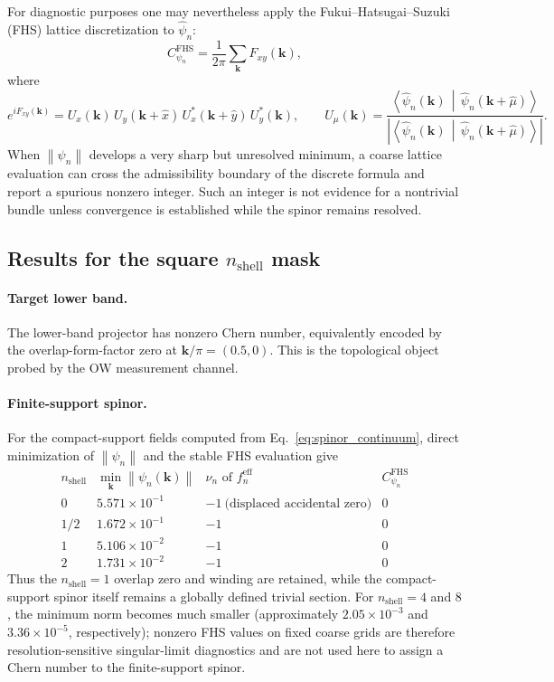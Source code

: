 \documentclass[aps,prb,onecolumn,nofootinbib,superscriptaddress]{revtex4-2}
\newcommand{\mbf}[1]{\mathbf{#1}}
\newcommand{\braket}[2]{\left\langle#1\,\middle|\,#2\right\rangle}
\newcommand{\norm}[1]{\left\lVert#1\right\rVert}
\begin{document}
For diagnostic purposes one may nevertheless apply the Fukui--Hatsugai--Suzuki (FHS) lattice discretization to $\hat{\psi}_n$:
\begin{equation}
C_{\psi_n}^{\mathrm{FHS}} = \frac{1}{2\pi}\sum_{\mbf{k}} F_{xy}(\mbf{k}),
\end{equation}
where
\begin{equation}
e^{iF_{xy}(\mbf{k})} = U_x(\mbf{k})\,U_y(\mbf{k}+\hat{x})\,U_x^*(\mbf{k}+\hat{y})\,U_y^*(\mbf{k}),
\qquad
U_\mu(\mbf{k}) = \frac{\braket{\hat{\psi}_n(\mbf{k})}{\hat{\psi}_n(\mbf{k}+\hat{\mu})}}{|\braket{\hat{\psi}_n(\mbf{k})}{\hat{\psi}_n(\mbf{k}+\hat{\mu})}|}.
\end{equation}
When $\norm{\psi_n}$ develops a very sharp but unresolved minimum, a coarse lattice evaluation can cross the admissibility boundary of the discrete formula and report a spurious nonzero integer.  Such an integer is not evidence for a nontrivial bundle unless convergence is established while the spinor remains resolved.

\subsection{Results for the square \texorpdfstring{$n_{\mathrm{shell}}$}{n-shell} mask}

\paragraph*{Target lower band.} The lower-band projector has nonzero Chern number, equivalently encoded by the overlap-form-factor zero at $\mbf{k}/\pi=(0.5,0)$.  This is the topological object probed by the OW measurement channel.

\paragraph*{Finite-support spinor.} For the compact-support fields computed from Eq.~\eqref{eq:spinor_continuum}, direct minimization of $\norm{\psi_n}$ and the stable FHS evaluation give
\begin{equation}
\begin{array}{c|c|c|c}
n_{\mathrm{shell}} & \min_{\mbf{k}}\norm{\psi_n(\mbf{k})} &
\nu_n\text{ of }f_n^{\mathrm{eff}} & C_{\psi_n}^{\mathrm{FHS}}\\
\hline
0   & 5.571\times10^{-1} & -1\ \text{(displaced accidental zero)} & 0\\
1/2 & 1.672\times10^{-1} & -1 & 0\\
1   & 5.106\times10^{-2} & -1 & 0\\
2   & 1.731\times10^{-2} & -1 & 0
\end{array}
\label{eq:fhs_corrected_table}
\end{equation}
Thus the $n_{\mathrm{shell}}=1$ overlap zero and winding are retained, while the compact-support spinor itself remains a globally defined trivial section.  For $n_{\mathrm{shell}}=4$ and $8$, the minimum norm becomes much smaller (approximately $2.05\times10^{-3}$ and $3.36\times10^{-5}$, respectively); nonzero FHS values on fixed coarse grids are therefore resolution-sensitive singular-limit diagnostics and are not used here to assign a Chern number to the finite-support spinor.
\end{document}
